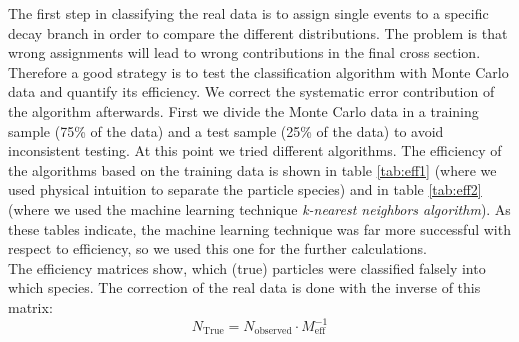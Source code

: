The first step in classifying the real data is to assign single events to a specific decay branch in order to
compare the different distributions. The problem is that wrong assignments will lead to wrong contributions 
in the final cross section. Therefore a good strategy is to test the classification algorithm with Monte Carlo data and 
quantify its efficiency. We correct the systematic error contribution of the algorithm afterwards. First we 
divide the Monte Carlo data in a training sample (75\% of the data) and a test sample (25\% of the data) to avoid
inconsistent testing.  At this point we tried different algorithms. The efficiency of the algorithms based on the training
data is shown in table \ref{tab:eff1} (where we used physical intuition to separate the particle species) and in table
\ref{tab:eff2} (where we used the machine learning technique \textit{k-nearest neighbors algorithm}). As these tables indicate,
the machine learning technique was far more successful with respect to efficiency, so we used this one for the further 
calculations. \\
The efficiency matrices show, which (true) particles were classified falsely into which species. The correction
of the real data is done with the inverse of this matrix:
\begin{equation}
    \label{eq:eff_inverse}
    N_{\mathrm{True}} = N_{ \mathrm{observed}} \cdot M_{\mathrm{eff}}^{-1}
\end{equation}


